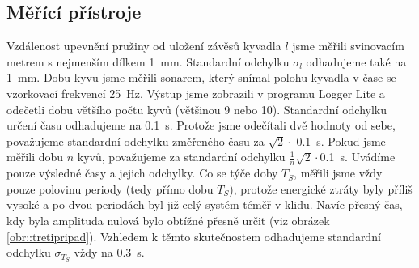 \subsection*{Měřící přístroje}
Vzdálenost upevnění pružiny od uložení závěsů kyvadla $l$ jsme měřili svinovacím metrem s nejmenším dílkem \SI{1}{\mm}. Standardní odchylku $\sigma_l$ odhadujeme také na \SI{1}{\mm}.
Dobu kyvu jsme měřili sonarem, který snímal polohu kyvadla v čase se vzorkovací frekvencí \SI{25}{\Hz}. Výstup jsme zobrazili v programu Logger Lite a odečetli dobu většího počtu kyvů (většinou 9 nebo 10). Standardní odchylku určení času odhadujeme na \SI{0,1}{\s}. Protože jsme odečítali dvě hodnoty od sebe, považujeme standardní odchylku změřeného času za $\sqrt{2}\cdot$ \SI{0,1}{\s}. Pokud jsme měřili dobu $n$ kyvů, považujeme za standardní odchylku $\frac{1}{n} \sqrt{2} \cdot$\SI{0,1}{\s}. Uvádíme pouze výsledné časy a jejich odchylky.
Co se týče doby $T_S$, měřili jsme vždy pouze polovinu periody (tedy přímo dobu $T_S$), protože energické ztráty byly příliš vysoké a po dvou periodách byl již celý systém téměř v klidu. Navíc přesný čas, kdy byla amplituda nulová bylo obtížné přesně určit (viz obrázek \ref{obr::tretipripad}). Vzhledem k těmto skutečnostem odhadujeme standardní odchylku $\sigma_{T_S}$ vždy na \SI{0,3}{s}.